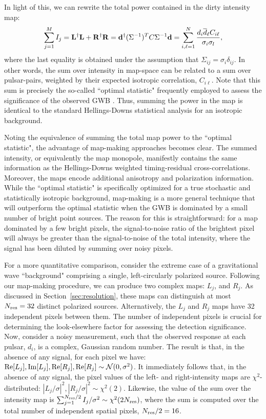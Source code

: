 \documentclass[%
 reprint,
nofootinbib,
 amsmath,amssymb,
 aps,
]{revtex4-2}
\begin{document}
In light of this, we can rewrite the total power contained in the dirty intensity map:
\begin{equation}
    \sum_{j=1}^M I_j = {\bf L}^\dagger {\bf L} + {\bf R}^\dagger{\bf R} = {\bf d}^\dagger (\Sigma^{-1})^T C \Sigma^{-1}{\bf d} = \sum_{i,\ell = 1}^N \frac{d_i \overline{d}_\ell C_{i \ell}}{\sigma_i \sigma_l},
\end{equation}
where the last equality is obtained under the assumption that $\Sigma_{ij} = \sigma_i \delta_{ij}$. In other words, the sum over intensity in map-space can be related to a sum over pulsar-pairs, weighted by their expected isotropic correlation, $C_{i\ell}$. Note that this sum is precisely the so-called ``optimal statistic" frequently employed to assess the significance of the observed GWB \citep{2009PhRvD..79h4030A, 2015PhRvD..91d4048C, NANOGravdetection}. Thus, summing the power in the map is identical to the standard Hellings-Downs statistical analysis for an isotropic background.

Noting the equivalence of summing the total map power to the ``optimal statistic", the advantage of map-making approaches becomes clear. The summed intensity, or equivalently the map monopole, manifestly contains the same information as the Hellings-Downs weighted timing-residual cross-correlations. Moreover, the maps encode additional anisotropy and polarization information. While the ``optimal statistic" is specifically optimized for a true stochastic and statistically isotropic background, map-making is a more general technique that will outperform the optimal statistic when the GWB is dominated by a small number of bright point sources. The reason for this is straightforward: for a map dominated by a few bright pixels, the signal-to-noise ratio of the brightest pixel will always be greater than the signal-to-noise of the total intensity, where the signal has been diluted by summing over noisy pixels. 

For a more quantitative comparison, consider the extreme case of a gravitational wave ``background" comprising a single, left-circularly polarized source. Following our map-making procedure, we can produce two complex maps: $L_j$, and $R_j$. As discussed in Section~\ref{sec:resolution}, these maps can distinguish at most $N_{\rm res} = 32$ distinct polarized sources. Alternatively, the $L_j$ and $R_j$ maps have 32 independent pixels between them. The number of independent pixels is crucial for determining the look-elsewhere factor for assessing the detection significance. Now, consider a noisy  measurement, such that the observed response at each pulsar, $d_i$, is a complex, Gaussian random number. The result is that, in the absence of any signal, for each pixel we have: ${\rm Re}[L_j],{\rm Im}[L_j], {\rm Re}[R_j], {\rm Re}[R_j] \sim \mathcal{N}(0,\sigma^2)$. It immediately follows that, in the absence of any signal, the pixel values of the left- and right-intensity maps are $\chi^2$-distributed: $|L_j / \sigma|^2, |R_j / \sigma|^2 \sim \chi^2(2)$. Likewise, the value of the sum over the intensity map is $\sum_{j=1}^{N_{\rm res}/2} I_j / \sigma^2 \sim \chi^2(2 N_{\rm res})$, where the sum is computed over the total number of independent spatial pixels, $N_{\rm res} / 2 = 16$.
\end{document}
